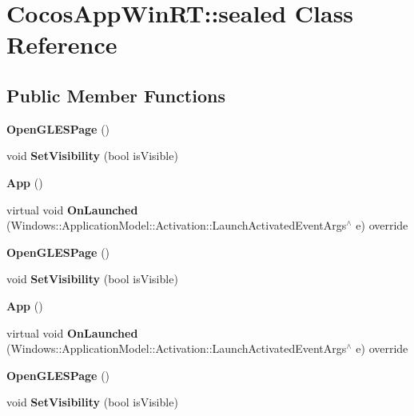 \hypertarget{classCocosAppWinRT_1_1sealed}{}\section{Cocos\+App\+Win\+RT\+:\+:sealed Class Reference}
\label{classCocosAppWinRT_1_1sealed}
\subsection*{Public Member Functions}
\begin{DoxyCompactItemize}
\item 
\mbox{\label{classCocosAppWinRT_1_1sealed_afddbabef1ec1ab2d0e411857ac5eab2c}} 
{\bfseries Open\+G\+L\+E\+S\+Page} ()
\item 
\mbox{\label{classCocosAppWinRT_1_1sealed_aa44dcb2ba0999d201d5a15a63c24b500}} 
void {\bfseries Set\+Visibility} (bool is\+Visible)
\item 
\mbox{\label{classCocosAppWinRT_1_1sealed_a4b0debf5070428e99988f30ac3953e62}} 
{\bfseries App} ()
\item 
\mbox{\label{classCocosAppWinRT_1_1sealed_a59a8d4cd3444b4dd35f0fb37b2ca81eb}} 
virtual void {\bfseries On\+Launched} (Windows\+::\+Application\+Model\+::\+Activation\+::\+Launch\+Activated\+Event\+Args$^\wedge$ e) override
\item 
\mbox{\label{classCocosAppWinRT_1_1sealed_afddbabef1ec1ab2d0e411857ac5eab2c}} 
{\bfseries Open\+G\+L\+E\+S\+Page} ()
\item 
\mbox{\label{classCocosAppWinRT_1_1sealed_aa44dcb2ba0999d201d5a15a63c24b500}} 
void {\bfseries Set\+Visibility} (bool is\+Visible)
\item 
\mbox{\label{classCocosAppWinRT_1_1sealed_a4b0debf5070428e99988f30ac3953e62}} 
{\bfseries App} ()
\item 
\mbox{\label{classCocosAppWinRT_1_1sealed_a59a8d4cd3444b4dd35f0fb37b2ca81eb}} 
virtual void {\bfseries On\+Launched} (Windows\+::\+Application\+Model\+::\+Activation\+::\+Launch\+Activated\+Event\+Args$^\wedge$ e) override
\item 
\mbox{\label{classCocosAppWinRT_1_1sealed_afddbabef1ec1ab2d0e411857ac5eab2c}} 
{\bfseries Open\+G\+L\+E\+S\+Page} ()
\item 
\mbox{\label{classCocosAppWinRT_1_1sealed_aa44dcb2ba0999d201d5a15a63c24b500}} 
void {\bfseries Set\+Visibility} (bool is\+Visible)
\end{DoxyCompactItemize}
